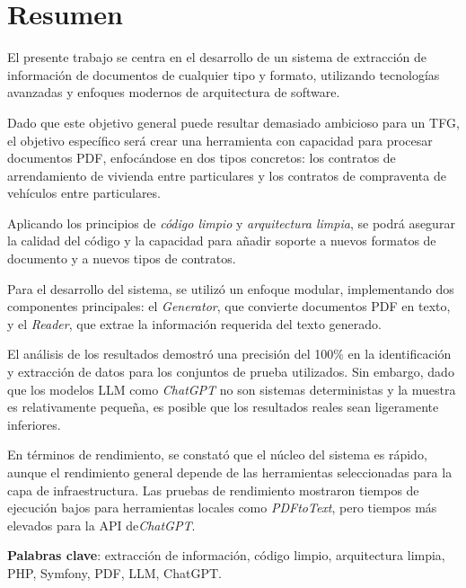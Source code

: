 \newpage
\section*{Resumen}

El presente trabajo se centra en el desarrollo de un sistema de extracción de información de documentos de cualquier
tipo y formato, utilizando tecnologías avanzadas y enfoques modernos de arquitectura de software.

Dado que este objetivo general puede resultar demasiado ambicioso para un TFG, el objetivo específico será crear una
herramienta con capacidad para procesar documentos PDF, enfocándose en dos tipos concretos: los contratos de
arrendamiento de vivienda entre particulares y los contratos de compraventa de vehículos entre particulares.

Aplicando los principios de \textit{código limpio} y \textit{arquitectura limpia}, se podrá asegurar la calidad del
código y la capacidad para añadir soporte a nuevos formatos de documento y a nuevos tipos de contratos.

Para el desarrollo del sistema, se utilizó un enfoque modular, implementando dos componentes principales: el
\textit{Generator}, que convierte documentos PDF en texto, y el \textit{Reader}, que extrae la información requerida
del texto generado.

El análisis de los resultados demostró una precisión del 100\% en la identificación y extracción de datos para los
conjuntos de prueba utilizados.
Sin embargo, dado que los modelos LLM como \textit{ChatGPT} no son sistemas deterministas y la muestra es relativamente
pequeña, es posible que los resultados reales sean ligeramente inferiores.

En términos de rendimiento, se constató que el núcleo del sistema es rápido, aunque el rendimiento general depende de
las herramientas seleccionadas para la capa de infraestructura.
Las pruebas de rendimiento mostraron tiempos de ejecución bajos para herramientas locales como \textit{PDFtoText}, pero
tiempos más elevados para la API de\textit{ChatGPT}.


\vspace{1cm}

\textbf{Palabras clave}: extracción de información, código limpio, arquitectura limpia, PHP, Symfony, PDF, LLM, ChatGPT.